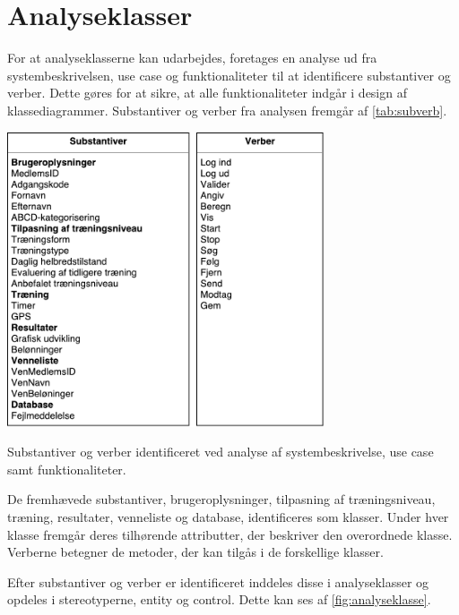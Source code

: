 \section{Analyseklasser}
For at analyseklasserne kan udarbejdes, foretages en analyse ud fra systembeskrivelsen, use case og funktionaliteter til at identificere substantiver og verber. Dette gøres for at sikre, at alle funktionaliteter indgår i design af klassediagrammer. Substantiver og verber fra analysen fremgår af \autoref{tab:subverb}.

\begin{table}[H]
\centering
\includegraphics[width=0.7\textwidth]{figures/aktivitetsdiagram/substantiveverber}
\caption{Substantiver og verber identificeret ved analyse af systembeskrivelse, use case samt funktionaliteter.}
\label{tab:subverb}
\end{table}

\noindent
De fremhævede substantiver, brugeroplysninger, tilpasning af træningsniveau, træning, resultater, venneliste og database, identificeres som klasser. Under hver klasse fremgår deres tilhørende attributter, der beskriver den overordnede klasse. Verberne betegner de metoder, der kan tilgås i de forskellige klasser. 

Efter substantiver og verber er identificeret inddeles disse i analyseklasser og opdeles i stereotyperne, entity og control. Dette kan ses af \autoref{fig:analyseklasse}. 


